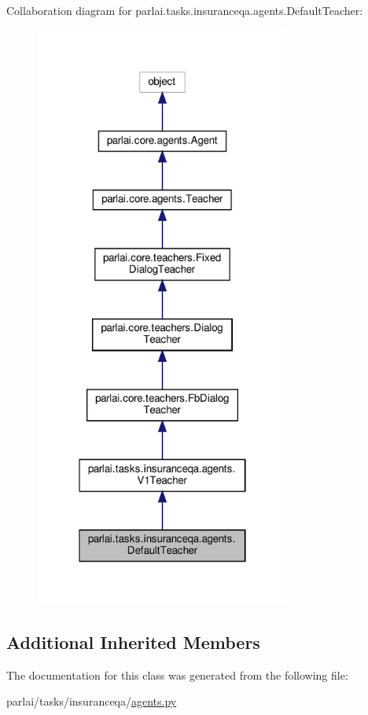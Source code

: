 Collaboration diagram for parlai.\+tasks.\+insuranceqa.\+agents.\+Default\+Teacher\+:
\nopagebreak
\begin{figure}[H]
\begin{center}
\leavevmode
\includegraphics[width=238pt]{classparlai_1_1tasks_1_1insuranceqa_1_1agents_1_1DefaultTeacher__coll__graph}
\end{center}
\end{figure}
\subsection*{Additional Inherited Members}


The documentation for this class was generated from the following file\+:\begin{DoxyCompactItemize}
\item 
parlai/tasks/insuranceqa/\hyperlink{parlai_2tasks_2insuranceqa_2agents_8py}{agents.\+py}\end{DoxyCompactItemize}

